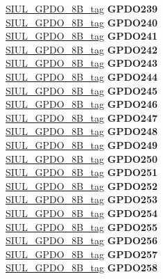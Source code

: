 \begin{DoxyCompactItemize}
\begin{tabbing}
\>\>\mbox{\hyperlink{unionSIUL__GPDO__8B__tag}{SIUL\_GPDO\_8B\_tag}} {\bfseries GPDO239}\\
\>\>\mbox{\hyperlink{unionSIUL__GPDO__8B__tag}{SIUL\_GPDO\_8B\_tag}} {\bfseries GPDO240}\\
\>\>\mbox{\hyperlink{unionSIUL__GPDO__8B__tag}{SIUL\_GPDO\_8B\_tag}} {\bfseries GPDO241}\\
\>\>\mbox{\hyperlink{unionSIUL__GPDO__8B__tag}{SIUL\_GPDO\_8B\_tag}} {\bfseries GPDO242}\\
\>\>\mbox{\hyperlink{unionSIUL__GPDO__8B__tag}{SIUL\_GPDO\_8B\_tag}} {\bfseries GPDO243}\\
\>\>\mbox{\hyperlink{unionSIUL__GPDO__8B__tag}{SIUL\_GPDO\_8B\_tag}} {\bfseries GPDO244}\\
\>\>\mbox{\hyperlink{unionSIUL__GPDO__8B__tag}{SIUL\_GPDO\_8B\_tag}} {\bfseries GPDO245}\\
\>\>\mbox{\hyperlink{unionSIUL__GPDO__8B__tag}{SIUL\_GPDO\_8B\_tag}} {\bfseries GPDO246}\\
\>\>\mbox{\hyperlink{unionSIUL__GPDO__8B__tag}{SIUL\_GPDO\_8B\_tag}} {\bfseries GPDO247}\\
\>\>\mbox{\hyperlink{unionSIUL__GPDO__8B__tag}{SIUL\_GPDO\_8B\_tag}} {\bfseries GPDO248}\\
\>\>\mbox{\hyperlink{unionSIUL__GPDO__8B__tag}{SIUL\_GPDO\_8B\_tag}} {\bfseries GPDO249}\\
\>\>\mbox{\hyperlink{unionSIUL__GPDO__8B__tag}{SIUL\_GPDO\_8B\_tag}} {\bfseries GPDO250}\\
\>\>\mbox{\hyperlink{unionSIUL__GPDO__8B__tag}{SIUL\_GPDO\_8B\_tag}} {\bfseries GPDO251}\\
\>\>\mbox{\hyperlink{unionSIUL__GPDO__8B__tag}{SIUL\_GPDO\_8B\_tag}} {\bfseries GPDO252}\\
\>\>\mbox{\hyperlink{unionSIUL__GPDO__8B__tag}{SIUL\_GPDO\_8B\_tag}} {\bfseries GPDO253}\\
\>\>\mbox{\hyperlink{unionSIUL__GPDO__8B__tag}{SIUL\_GPDO\_8B\_tag}} {\bfseries GPDO254}\\
\>\>\mbox{\hyperlink{unionSIUL__GPDO__8B__tag}{SIUL\_GPDO\_8B\_tag}} {\bfseries GPDO255}\\
\>\>\mbox{\hyperlink{unionSIUL__GPDO__8B__tag}{SIUL\_GPDO\_8B\_tag}} {\bfseries GPDO256}\\
\>\>\mbox{\hyperlink{unionSIUL__GPDO__8B__tag}{SIUL\_GPDO\_8B\_tag}} {\bfseries GPDO257}\\
\>\>\mbox{\hyperlink{unionSIUL__GPDO__8B__tag}{SIUL\_GPDO\_8B\_tag}} {\bfseries GPDO258}\\

\end{tabbing}
\end{DoxyCompactItemize}
